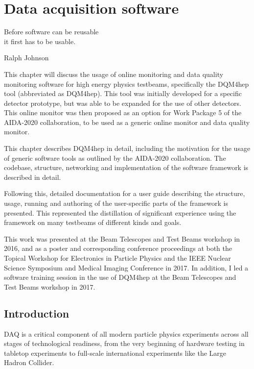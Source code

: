 \chapter{Data acquisition software}
\label{chapter:dqm4hep}

\epigraph{Before software can be reusable \\it first has to be usable.}{Ralph Johnson}

This chapter will discuss the usage of online monitoring and data quality monitoring software for high energy physics testbeams, specifically the \acrlong{DQM4hep} tool (abbreviated as \acrshort{DQM4hep}). This tool was initially developed for a specific detector prototype, but was able to be expanded for the use of other detectors. This online monitor was then proposed as an option for Work Package 5 of the \acrshort{AIDA}-2020 collaboration, to be used as a generic online monitor and data quality monitor.

This chapter describes \acrshort{DQM4hep} in detail, including the motivation for the usage of generic software tools as outlined by the \acrshort{AIDA}-2020 collaboration. The codebase, structure, networking and implementation of the software framework is described in detail.

Following this, detailed documentation for a user guide describing the structure, usage, running and authoring of the user-specific parts of the framework is presented. This represented the distillation of significant experience using the framework on many testbeams of different kinds and goals.

This work was presented at the Beam Telescopes and Test Beams workshop in 2016, and as a poster and corresponding conference proceedings at both the Topical Workshop for Electronics in Particle Physics\cite{dqm4hep-twepp} and the \acrshort{IEEE} Nuclear Science Symposium and Medical Imaging Conference\cite{dqm4hep-ieee} in 2017. In addition, I led a software training session in the use of \acrshort{DQM4hep} at the Beam Telescopes and Test Beams workshop in 2017. %

\section{Introduction}
\acrfull{DAQ} is a critical component of all modern particle physics experiments across all stages of technological readiness, from the very beginning of hardware testing in tabletop experiments to full-scale international experiments like the Large Hadron Collider.

